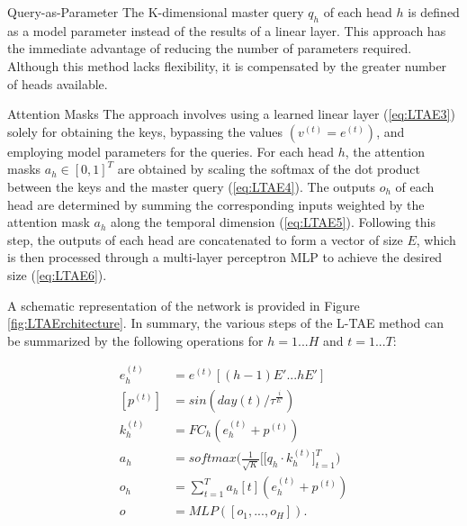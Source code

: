 \begin{paragraph}{Query-as-Parameter} 
The K-dimensional master query $q_h$ of each head $h$ is defined as a model parameter instead of the results of a linear layer.
This approach has the immediate advantage of reducing the number of parameters required.
Although this method lacks flexibility, it is compensated by the greater number of heads available.
\end{paragraph} 

\begin{paragraph}{Attention Masks}
The approach involves using a learned linear layer (\ref{eq:LTAE3}) solely for obtaining the keys, bypassing the values $(v^{(t)} = e^{(t)})$, and employing model parameters for the queries.
For each head $h$, the attention masks $a_h \in [0, 1]^T$ are obtained by scaling the softmax of the dot product between the keys and the master query (\ref{eq:LTAE4}).
The outputs $o_h$ of each head are determined by summing the corresponding inputs weighted by the attention mask $a_h$ along the temporal dimension (\ref{eq:LTAE5}).
Following this step, the outputs of each head are concatenated to form a vector of size $E$, which is then processed through a multi-layer perceptron MLP to achieve the desired size (\ref{eq:LTAE6}).

A schematic representation of the network is provided in Figure \ref{fig:LTAErchitecture}.
In summary, the various steps of the L-TAE method can be summarized by the following operations for $h = 1...H$ and $t = 1...T$:

\begin{align}
  e^{(t)}_h &= e^{(t)}[(h-1) E'...hE']                                  \label{eq:LTAE1}\\
  [p^{(t)}] &= sin(day(t)/\tau^{\frac{i}{E'}})                          \label{eq:LTAE2}\\
  k^{(t)}_h &= FC_h(e^{(t)}_h + p^{(t)})                                \label{eq:LTAE3}\\
  a_h       &= softmax \Bigr(\frac{1}{\sqrt{K}} \Bigr[[q_h \cdot k^{(t)}_h\Bigr]^T_{t=1}\Bigr) \label{eq:LTAE4}\\
  o_h       &= \sum_{t=1}^{T} a_h[t] (e^{(t)}_h + p^{(t)})              \label{eq:LTAE5}\\
  o         &= MLP([o_1,...,o_H]).                                      \label{eq:LTAE6}
\end{align}

\end{paragraph}

